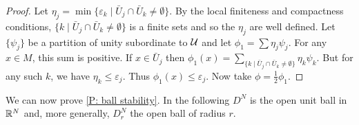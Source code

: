 \begin{proof}
	Let $\eta_j = \min\{\varepsilon_k \mid \bar U_j \cap \bar U_k\neq \emptyset\}$.
	By the local finiteness and compactness conditions, $\{k \mid \bar U_j \cap \bar U_k\neq \emptyset\}$ is a finite sets and so the $\eta_j$ are well defined.
	Let $\{\psi_j\}$ be a partition of unity subordinate to $\mathcal{U}$ and let $\phi_1 = \sum \eta_j\psi_j$.
	For any $x \in M$, this sum is positive.
	If $x \in \bar U_j$ then $\phi_1(x) = \sum_{\{k \mid \bar U_j \cap \bar U_k\neq \emptyset\}} \eta_k\psi_k$.
	But for any such $k$, we have $\eta_k \leq \varepsilon_j$.
	Thus $\phi_1(x) \leq \varepsilon_j$.
	Now take $\phi = \frac{1}{2}\phi_1$.
\end{proof}

We can now prove \cref{P: ball stability}.
In the following $D^N$ is the open unit ball in $\mathbb{R}^N$ and, more generally, $D^N_r$ the open ball of radius $r$.

